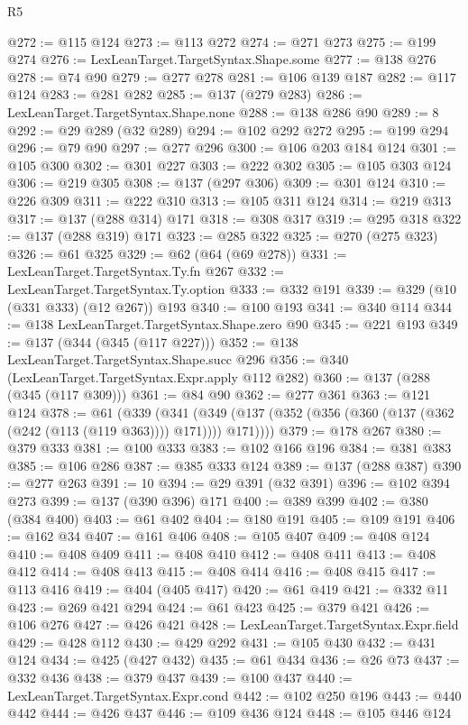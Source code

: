 \begin{lexlean}{R5}
\begin{coremodule}
{{{{{{{{{{{{{{{{{{{{{{{{{{{{{{{{{{{{{{{{{{{{{{{{{{{{{{{{{{{{{{{{{{{{{{{{{{{{{{{{{{{{@272 := @115 @124
@273 := @113 @272
@274 := @271 @273
@275 := @199 @274
@276 := LexLeanTarget.TargetSyntax.Shape.some
@277 := @138 @276
@278 := @74 @90
@279 := @277 @278
@281 := @106 @139 @187
@282 := @117 @124
@283 := @281 @282
@285 := @137 (@279 @283)
@286 := LexLeanTarget.TargetSyntax.Shape.none
@288 := @138 @286 @90
@289 := 8
@292 := @29 @289 (@32 @289)
@294 := @102 @292 @272
@295 := @199 @294
@296 := @79 @90
@297 := @277 @296
@300 := @106 @203 @184 @124
@301 := @105 @300
@302 := @301 @227
@303 := @222 @302
@305 := @105 @303 @124
@306 := @219 @305
@308 := @137 (@297 @306)
@309 := @301 @124
@310 := @226 @309
@311 := @222 @310
@313 := @105 @311 @124
@314 := @219 @313
@317 := @137 (@288 @314) @171
@318 := @308 @317
@319 := @295 @318
@322 := @137 (@288 @319) @171
@323 := @285 @322
@325 := @270 (@275 @323)
@326 := @61 @325
@329 := @62 (@64 (@69 @278))
@331 := LexLeanTarget.TargetSyntax.Ty.fn @267
@332 := LexLeanTarget.TargetSyntax.Ty.option
@333 := @332 @191
@339 := @329 (@10 (@331 @333) (@12 @267)) @193
@340 := @100 @193
@341 := @340 @114
@344 := @138 LexLeanTarget.TargetSyntax.Shape.zero @90
@345 := @221 @193
@349 := @137 (@344 (@345 (@117 @227)))
@352 := @138 LexLeanTarget.TargetSyntax.Shape.succ @296
@356 := @340 (LexLeanTarget.TargetSyntax.Expr.apply @112 @282)
@360 := @137 (@288 (@345 (@117 @309)))
@361 := @84 @90
@362 := @277 @361
@363 := @121 @124
@378 := @61
    (@339
      (@341 (@349 (@137 (@352 (@356 (@360 (@137 (@362 (@242 (@113 (@119 @363)))) @171)))) @171))))
@379 := @178 @267
@380 := @379 @333
@381 := @100 @333
@383 := @102 @166 @196
@384 := @381 @383
@385 := @106 @286
@387 := @385 @333 @124
@389 := @137 (@288 @387)
@390 := @277 @263
@391 := 10
@394 := @29 @391 (@32 @391)
@396 := @102 @394 @273
@399 := @137 (@390 @396) @171
@400 := @389 @399
@402 := @380 (@384 @400)
@403 := @61 @402
@404 := @180 @191
@405 := @109 @191
@406 := @162 @34
@407 := @161 @406
@408 := @105 @407
@409 := @408 @124
@410 := @408 @409
@411 := @408 @410
@412 := @408 @411
@413 := @408 @412
@414 := @408 @413
@415 := @408 @414
@416 := @408 @415
@417 := @113 @416
@419 := @404 (@405 @417)
@420 := @61 @419
@421 := @332 @11
@423 := @269 @421 @294
@424 := @61 @423
@425 := @379 @421
@426 := @106 @276
@427 := @426 @421
@428 := LexLeanTarget.TargetSyntax.Expr.field
@429 := @428 @112
@430 := @429 @292
@431 := @105 @430
@432 := @431 @124
@434 := @425 (@427 @432)
@435 := @61 @434
@436 := @26 @73
@437 := @332 @436
@438 := @379 @437
@439 := @100 @437
@440 := LexLeanTarget.TargetSyntax.Expr.cond
@442 := @102 @250 @196
@443 := @440 @442
@444 := @426 @437
@446 := @109 @436 @124
@448 := @105 @446 @124
}}}}}}}}}}}}}}}}}}}}}}}}}}}}}}}}}}}}}}}}}}}}}}}}}}}}}}}}}}}}}}}}}}}}}}}}}}}}}}}}}}}}
\end{coremodule}
\end{lexlean}
